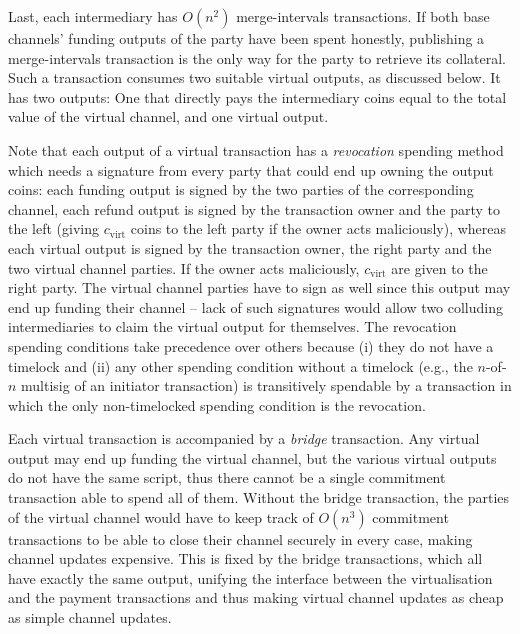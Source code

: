   Last, each intermediary has $O(n^2)$ merge-intervals transactions. If both
  base channels' funding outputs of the party have been spent honestly,
  publishing a merge-intervals
  transaction is the only way for the party to retrieve its collateral. Such a
  transaction consumes two suitable virtual outputs, as discussed below. It has
  two outputs: One that directly pays the intermediary coins equal to the total
  value of the virtual channel, and one virtual output.

  Note that each output of a virtual transaction has a \emph{revocation} spending
  method which needs a signature from every party that could end up owning the
  output coins: each funding output is signed by the two parties of the
  corresponding channel, each refund output is signed by the transaction owner
  and the party to the left (giving $c_{\mathrm{virt}}$ coins to the left party
  if the owner acts maliciously), whereas each virtual output is signed by the
  transaction owner, the right party and the two virtual channel parties. If the
  owner acts maliciously, $c_{\mathrm{virt}}$ are given to the right party. The
  virtual channel parties have to sign as well since this output may end up
  funding their channel -- lack of such signatures would allow two colluding
  intermediaries to claim the virtual output for themselves. The revocation
  spending conditions take precedence over others because (i) they do not have a
  timelock and (ii) any other spending condition without a timelock (e.g., the
  $n$-of-$n$ multisig of an initiator transaction) is transitively spendable by
  a transaction in which the only non-timelocked spending condition is the
  revocation.

  Each virtual transaction is accompanied by a \emph{bridge} transaction. Any
  virtual output may end up funding the virtual channel, but the various virtual
  outputs do not have the same script, thus there cannot be a single commitment
  transaction able to spend all of them. Without the bridge transaction, the
  parties of the virtual channel would have to keep track of $O(n^3)$ commitment
  transactions to be able to close their channel securely in every case, making
  channel updates expensive. This is fixed by the bridge transactions, which all
  have exactly the same output, unifying the interface between the
  virtualisation and the payment transactions and thus making virtual channel
  updates as cheap as simple channel updates.


